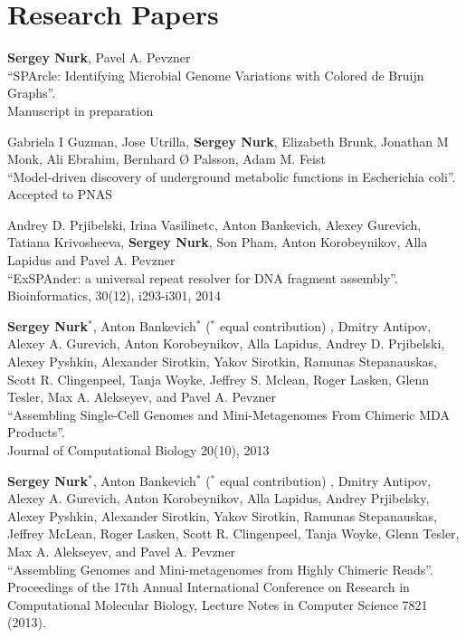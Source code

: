 \section{Research Papers}
%
\begin{innerlist}
\item 
\textbf{Sergey Nurk}, Pavel A. Pevzner\\
``SPArcle: Identifying Microbial Genome Variations with Colored de Bruijn Graphs''. \\
Manuscript in preparation

\blankline

\item Gabriela I Guzman, Jose Utrilla, \textbf{Sergey Nurk}, Elizabeth Brunk, Jonathan M Monk, Ali Ebrahim, Bernhard Ø Palsson, Adam M. Feist\\
``Model-driven discovery of underground metabolic functions in Escherichia coli''. \\
Accepted to PNAS

\blankline

\item Andrey D. Prjibelski, Irina Vasilinetc, Anton Bankevich, Alexey Gurevich, Tatiana Krivosheeva, \textbf{Sergey Nurk}, Son Pham, Anton Korobeynikov, Alla Lapidus and Pavel A. Pevzner\\
``ExSPAnder: a universal repeat resolver for DNA fragment assembly''. \\
Bioinformatics, 30(12), i293-i301, 2014

\blankline

\item \textbf{Sergey Nurk}$^*$, Anton Bankevich$^*$ ($^*$ equal contribution)%
, Dmitry Antipov, Alexey A. Gurevich, Anton Korobeynikov, Alla Lapidus, Andrey D. Prjibelski, Alexey Pyshkin, Alexander Sirotkin, Yakov Sirotkin, Ramunas Stepanauskas, Scott R. Clingenpeel, Tanja Woyke, Jeffrey S. Mclean, Roger Lasken, Glenn Tesler, Max A. Alekseyev, and Pavel A. Pevzner \\
``Assembling Single-Cell Genomes and Mini-Metagenomes From Chimeric MDA Products''. \\
Journal of Computational Biology 20(10), 2013

\blankline

\item \textbf{Sergey Nurk}$^*$, Anton Bankevich$^*$ ($^*$ equal contribution)%
, Dmitry Antipov, Alexey A. Gurevich, Anton Korobeynikov, Alla Lapidus, Andrey Prjibelsky, Alexey Pyshkin, Alexander Sirotkin, Yakov Sirotkin, Ramunas Stepanauskas, Jeffrey McLean, Roger Lasken, Scott R. Clingenpeel, Tanja Woyke, Glenn Tesler, Max A. Alekseyev, and Pavel A. Pevzner \\
``Assembling Genomes and Mini-metagenomes from Highly Chimeric Reads''. \\
Proceedings of the 17th Annual International Conference on Research in Computational Molecular Biology, Lecture Notes in Computer Science 7821 (2013).


\end{innerlist}
